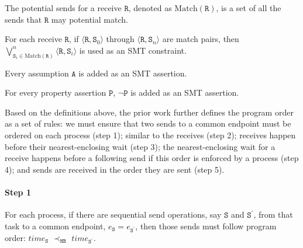 
\begin{definition}\label{def:potential}
The potential sends for a receive $\mathtt{R}$, denoted as $\mathrm{Match}(\mathtt{R})$, is a set of all the sends that $\mathtt{R}$ may potential match.
\end{definition}

\begin{definition} \label{def:receive_match}
For each receive $\mathtt{R}$, if $\langle\mathtt{R},
\mathtt{S}_0\rangle$ through $\langle\mathtt{R}, \mathtt{S}_n\rangle$
are match pairs, then $\bigvee_{\mathtt{S}_i \in \mathrm{Match}(\mathtt{R})}^{n} \langle\mathtt{R},
\mathtt{S}_i\rangle$ is used as an SMT constraint.
\end{definition}

\begin{definition}[Assumption] \label{def:assm}
Every assumption $\mathtt{A}$ is added as an SMT assertion.
\end{definition}

\begin{definition} \label{def:assert}
For every property assertion $\mathtt{P}$, $\neg \mathtt{P}$ is added as
an SMT assertion.
\end{definition}

Based on the definitions above, the prior work further defines the program order as a set of rules: we must ensure that two sends to a common endpoint must be ordered on each process (step 1); similar to the receives (step 2); receives happen before their nearest-enclosing wait (step 3); the nearest-enclosing wait for a receive happens before a following send if this order is enforced by a process (step 4); and sends are received in the order they are sent (step 5). 

\paragraph*{Step 1} For each process, if there are sequential send
operations, say $\mathtt{S}$ and $\mathtt{S^\prime}$, from that task
to a common endpoint, $e_\mathtt{S} = e_\mathtt{S^\prime}$, then those
sends must follow program order: $\mathit{time}_\mathtt{S}$
$\prec_\mathtt{HB}$ $\mathit{time}_\mathtt{S^\prime}$.

